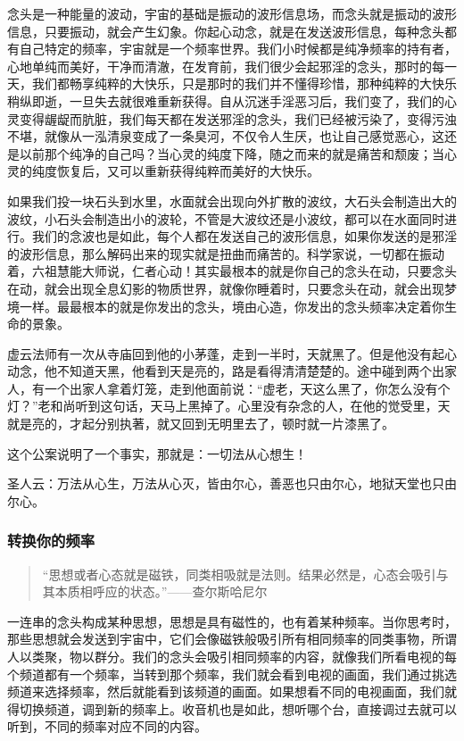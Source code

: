 \documentclass[fontset=founder]{ctexart}
\begin{document}
念头是一种能量的波动，宇宙的基础是振动的波形信息场，而念头就是振动的波形信息，只要振动，就会产生幻象。你起心动念，就是在发送波形信息，每种念头都有自己特定的频率，宇宙就是一个频率世界。我们小时候都是纯净频率的持有者，心地单纯而美好，干净而清澈，在发育前，我们很少会起邪淫的念头，那时的每一天，我们都畅享纯粹的大快乐，只是那时的我们并不懂得珍惜，那种纯粹的大快乐稍纵即逝，一旦失去就很难重新获得。自从沉迷手淫恶习后，我们变了，我们的心灵变得龌龊而肮脏，我们每天都在发送邪淫的念头，我们已经被污染了，变得污浊不堪，就像从一泓清泉变成了一条臭河，不仅令人生厌，也让自己感觉恶心，这还是以前那个纯净的自己吗？当心灵的纯度下降，随之而来的就是痛苦和颓废；当心灵的纯度恢复后，又可以重新获得纯粹而美好的大快乐。

如果我们投一块石头到水里，水面就会出现向外扩散的波纹，大石头会制造出大的波纹，小石头会制造出小的波轮，不管是大波纹还是小波纹，都可以在水面同时进行。我们的念波也是如此，每个人都在发送自己的波形信息，如果你发送的是邪淫的波形信息，那么解码出来的现实就是扭曲而痛苦的。科学家说，一切都在振动着，六祖慧能大师说，仁者心动！其实最根本的就是你自己的念头在动，只要念头在动，就会出现全息幻影的物质世界，就像你睡着时，只要念头在动，就会出现梦境一样。最最根本的就是你发出的念头，境由心造，你发出的念头频率决定着你生命的景象。

虚云法师有一次从寺庙回到他的小茅蓬，走到一半时，天就黑了。但是他没有起心动念，他不知道天黑，他看到天是亮的，路是看得清清楚楚的。途中碰到两个出家人，有一个出家人拿着灯笼，走到他面前说：“虚老，天这么黑了，你怎么没有个灯？”老和尚听到这句话，天马上黑掉了。心里没有杂念的人，在他的觉受里，天就是亮的，才起分别执著，就又回到无明里去了，顿时就一片漆黑了。

这个公案说明了一个事实，那就是：一切法从心想生！

圣人云：万法从心生，万法从心灭，皆由尔心，善恶也只由尔心，地狱天堂也只由尔心。

\subsubsection{转换你的频率}

\begin{quote}
    “思想或者心态就是磁铁，同类相吸就是法则。结果必然是，心态会吸引与其本质相呼应的状态。”\hfill ——查尔斯哈尼尔
\end{quote}

一连串的念头构成某种思想，思想是具有磁性的，也有着某种频率。当你思考时，那些思想就会发送到宇宙中，它们会像磁铁般吸引所有相同频率的同类事物，所谓人以类聚，物以群分。我们的念头会吸引相同频率的内容，就像我们所看电视的每个频道都有一个频率，当转到那个频率，我们就会看到电视的画面，我们通过挑选频道来选择频率，然后就能看到该频道的画面。如果想看不同的电视画面，我们就得切换频道，调到新的频率上。收音机也是如此，想听哪个台，直接调过去就可以听到，不同的频率对应不同的内容。
\end{document}
